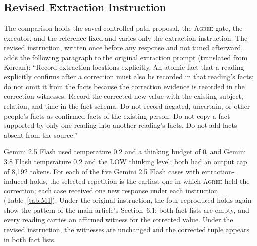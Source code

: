 \documentclass[acmsmall,review]{acmart}
\newcommand{\agree}{\textsc{Agree}}
\begin{document}
\subsection{Revised Extraction Instruction}
The comparison holds the saved controlled-path proposal, the \agree{} gate, the executor, and the reference fixed and varies only the extraction instruction. The revised instruction, written once before any response and not tuned afterward, adds the following paragraph to the original extraction prompt (translated from Korean): ``Record extraction locations explicitly. An atomic fact that a reading explicitly confirms after a correction must also be recorded in that reading's facts; do not omit it from the facts because the correction evidence is recorded in the correction witnesses. Record the corrected new value with the existing subject, relation, and time in the fact schema. Do not record negated, uncertain, or other people's facts as confirmed facts of the existing person. Do not copy a fact supported by only one reading into another reading's facts. Do not add facts absent from the source.''

Gemini 2.5 Flash used temperature 0.2 and a thinking budget of 0, and Gemini 3.8 Flash temperature 0.2 and the LOW thinking level; both had an output cap of 8,192 tokens. For each of the five Gemini 2.5 Flash cases with extraction-induced holds, the selected repetition is the earliest one in which \agree{} held the correction; each case received one new response under each instruction (Table~\ref{tab:M1}). Under the original instruction, the four reproduced holds again show the pattern of the main article's Section~6.1: both fact lists are empty, and every reading carries an affirmed witness for the corrected value. Under the revised instruction, the witnesses are unchanged and the corrected tuple appears in both fact lists.
\end{document}
